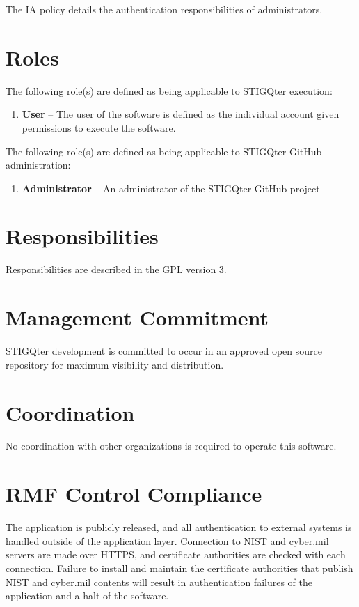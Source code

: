 \documentclass[letterpaper, 10pt, twoside]{article}
\begin{document}
The IA policy details the authentication responsibilities of administrators.

\section{Roles}
\label{sec:roles}

The following role(s) are defined as being applicable to STIGQter execution:
\begin{enumerate}
	\item \textbf{User} -- The user of the software is defined as the individual account given permissions to execute the software.
\end{enumerate}

The following role(s) are defined as being applicable to STIGQter GitHub administration:
\begin{enumerate}
	\item \textbf{Administrator} -- An administrator of the STIGQter GitHub project
\end{enumerate}

\section{Responsibilities}
\label{sec:responsibilities}

Responsibilities are described in the GPL version 3.

\section{Management Commitment}

STIGQter development is committed to occur in an approved open source repository for maximum visibility and distribution.

\section{Coordination}

No coordination with other organizations is required to operate this software.

\section{RMF Control Compliance}
\label{sec:compliance}

The application is publicly released, and all authentication to external systems is handled outside of the application layer. Connection to NIST and cyber.mil servers are made over HTTPS, and certificate authorities are checked with each connection. Failure to install and maintain the certificate authorities that publish NIST and cyber.mil contents will result in authentication failures of the application and a halt of the software.
\end{document}
